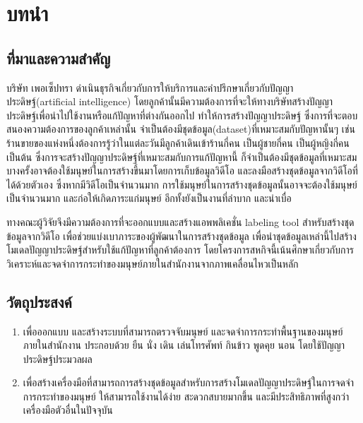 \chapter{บทนำ}
\section{ที่มาและความสำคัญ}
บริษัท เพอเซ็ปทรา ดำเนินธุรกิจเกี่ยวกับการให้บริการและคำปรึกษาเกี่ยวกับปัญญาประดิษฐ์(artificial intelligence)
โดยลูกค้านั้นมีความต้องการที่จะให้ทางบริษัทสร้างปัญญาประดิษฐ์เพื่อนำไปใช้งานหรือแก้ปัญหาที่ต่างกันออกไป 
ทำให้การสร้างปัญญาประดิษฐ์ ซึ่งการที่จะตอบสนองความต้องการของลูกค้าเหล่านั้น 
จำเป็นต้องมีชุดข้อมูล(dataset)ที่เหมาะสมกับปัญหานั้นๆ เช่น ร้านขายของแห่งหนึ่งต้องการรู้ว่าในแต่ละวันมีลูกค้าเดินเข้าร้านกี่คน เป็นผู้ชายกี่คน เป็นผู้หญิงกี่คน เป็นต้น
ซึ่งการจะสร้างปัญญาประดิษฐ์ที่เหมาะสมกับการแก้ปัญหานี้ ก็จำเป็นต้องมีชุดข้อมูลที่เหมาะสม บางครั้งอาจต้องใช้มนุษย์ในการสร้างขึ้นมาโดยการเก็บข้อมูลวิดีโอ 
และลงมือสร้างชุดข้อมูลจากวิดีโอที่ได้ด้วยตัวเอง ซึ่งหากมีวิดีโอเป็นจำนวนมาก การใช้มนุษย์ในการสร้างชุดข้อมูลนั้นอาจจะต้องใช้มนุษย์เป็นจำนวนมาก 
และก่อให้เกิดภาระแก่มนุษย์ อีกทั้งยังเป็นงานที่ลำบาก และน่าเบื่อ

ทางคณะผู้วิจัยจึงมีความต้องการที่จะออกแบบและสร้างแอพพลิเคชั่น labeling tool สำหรับสร้างชุดข้อมูลจากวิดีโอ เพื่อช่วยแบ่งเบาภาระของผู้พัฒนาในการสร้างชุดข้อมูล 
เพื่อนำชุดข้อมูลเหล่านี้ไปสร้างโมเดลปัญญาประดิษฐ์สำหรับใช้แก้ปัญหาที่ลูกค้าต้องการ โดยโครงการสหกิจนี้เน้นศึกษาเกี่ยวกับการวิเคราะห์และจดจำการกระทำของมนุษย์ภายในสำนักงานจากภาพเคลื่อนไหวเป็นหลัก

\section{วัตถุประสงค์}
\begin{enumerate}
	\setlength\itemsep{-0.25em}
	\item เพื่อออกแบบ และสร้างระบบที่สามารถตรวจจับมนุษย์ และจดจำการกระทำพื้นฐานของมนุษย์ภายในสำนักงาน 
	ประกอบด้วย ยืน นั่ง เดิน เล่นโทรศัพท์ กินข้าว พูดคุย นอน โดยใช้ปัญญาประดิษฐ์ประมวลผล
	\item เพื่อสร้างเครื่องมือที่สามารถการสร้างชุดข้อมูลสำหรับการสร้างโมเดลปัญญาประดิษฐ์ในการจดจำการกระทำของมนุษย์ ให้สามารถใช้งานได้ง่าย 
	สะดวกสบายมากขึ้น และมีประสิทธิภาพที่สูงกว่าเครื่องมือตัวอื่นในปัจจุบัน
\end{enumerate}

